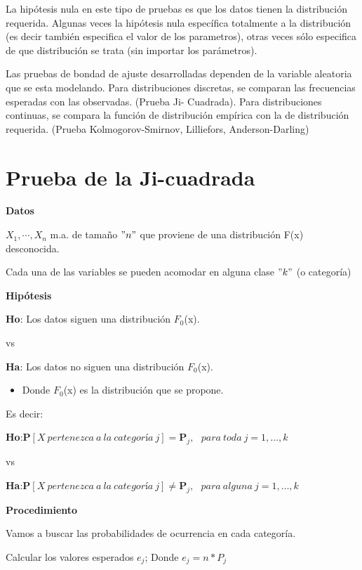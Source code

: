 \documentclass[a4paper,oneside,openany]{book}
\providecommand{\tightlist}{%
  \setlength{\itemsep}{0pt}\setlength{\parskip}{0pt}}
\begin{document}
La hipótesis nula en este tipo de pruebas es que los datos tienen la
distribución requerida. Algunas veces la hipótesis nula específica
totalmente a la distribución (es decir también especifica el valor de
los parametros), otras veces sólo especifica de que distribución se
trata (sin importar los parámetros).

Las pruebas de bondad de ajuste desarrolladas dependen de la variable
aleatoria que se esta modelando. Para distribuciones discretas, se
comparan las frecuencias esperadas con las observadas. (Prueba Ji-
Cuadrada). Para distribuciones continuas, se compara la función de
distribución empírica con la de distribución requerida. (Prueba
Kolmogorov-Smirnov, Lilliefors, Anderson-Darling)

\chapter{Prueba de la Ji-cuadrada}\label{prueba-de-la-ji-cuadrada}

\textbf{Datos}

\(X_{1},\cdots,X_{n}\) m.a. de tamaño \("n"\) que proviene de una
distribución F(x) desconocida.

Cada una de las variables se pueden acomodar en alguna clase \("k"\) (o
categoría)

\textbf{Hipótesis}

\textbf{Ho}: Los datos siguen una distribución \(F_{0}\)(x).

vs

\textbf{Ha}: Los datos no siguen una distribución \(F_{0}\)(x).

\begin{itemize}
\tightlist
\item
  Donde \(F_{0}\)(x) es la distribución que se propone.
\end{itemize}

Es decir:

\textbf{Ho}:\(\mathbf{P}[ X \ pertenezca\ a\ la\ categoría\ j ] = \mathbf{P}_{j},\ \ \ para\ toda\ j=1,\ldots,k\)

vs

\textbf{Ha}:\(\mathbf{P}[ X \ pertenezca\ a\ la\ categoría\ j ] \neq \mathbf{P}_{j}, \ \ \ para\ alguna\ j=1,\ldots,k\)

\textbf{Procedimiento}

Vamos a buscar las probabilidades de ocurrencia en cada categoría.

Calcular los valores esperados \(e_{j}\); Donde \(e_{j}=n*P_{j}\)
\end{document}

